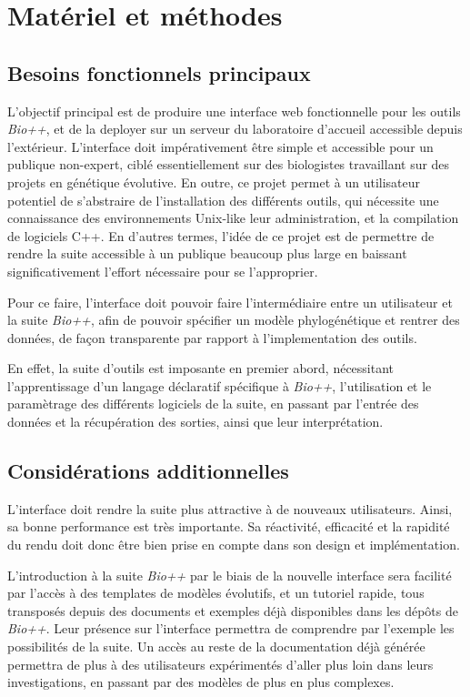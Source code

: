 \section{Matériel et méthodes}

\subsection{Besoins fonctionnels principaux}

L'objectif principal est de produire une interface web fonctionnelle pour les outils \textit{Bio++},
et de la deployer sur un serveur du laboratoire d'accueil accessible depuis l'extérieur.
L'interface doit impérativement être simple et accessible pour un publique non-expert,
ciblé essentiellement sur des biologistes travaillant sur des projets en génétique évolutive.
En outre, ce projet permet à un utilisateur potentiel
de s'abstraire de l'installation des différents outils,
qui nécessite une connaissance des environnements Unix-like
leur administration, et la compilation de logiciels C++.
En d'autres termes, l'idée de ce projet
est de permettre de rendre la suite accessible
à un publique beaucoup plus large
en baissant significativement l'effort nécessaire
pour se l'approprier.

Pour ce faire, l'interface doit pouvoir faire l'intermédiaire entre un utilisateur
et la suite \textit{Bio++},
afin de pouvoir spécifier un modèle phylogénétique et rentrer des données,
de façon transparente par rapport à l'implementation des outils.

En effet, la suite d'outils est imposante en premier abord,
nécessitant l'apprentissage d'un langage déclaratif spécifique à \textit{Bio++},
l'utilisation et le paramètrage des différents logiciels de la suite,
en passant par l'entrée des données et la récupération des sorties,
ainsi que leur interprétation.


\subsection{Considérations additionnelles}

L'interface doit rendre la suite plus attractive à de nouveaux utilisateurs.
Ainsi, sa bonne performance est très importante.
Sa réactivité, efficacité et la rapidité du rendu
doit donc être bien prise en compte dans son design et implémentation.

L'introduction à la suite \textit{Bio++} par le biais de la nouvelle interface
sera facilité par l'accès à des templates de modèles évolutifs,
et un tutoriel rapide,
tous transposés depuis des documents et exemples
déjà disponibles dans les dépôts de \textit{Bio++}.
Leur présence sur l'interface permettra de comprendre par l'exemple
les possibilités de la suite.
Un accès au reste de la documentation déjà générée permettra de plus
à des utilisateurs expérimentés d'aller plus loin dans leurs investigations,
en passant par des modèles de plus en plus complexes.


